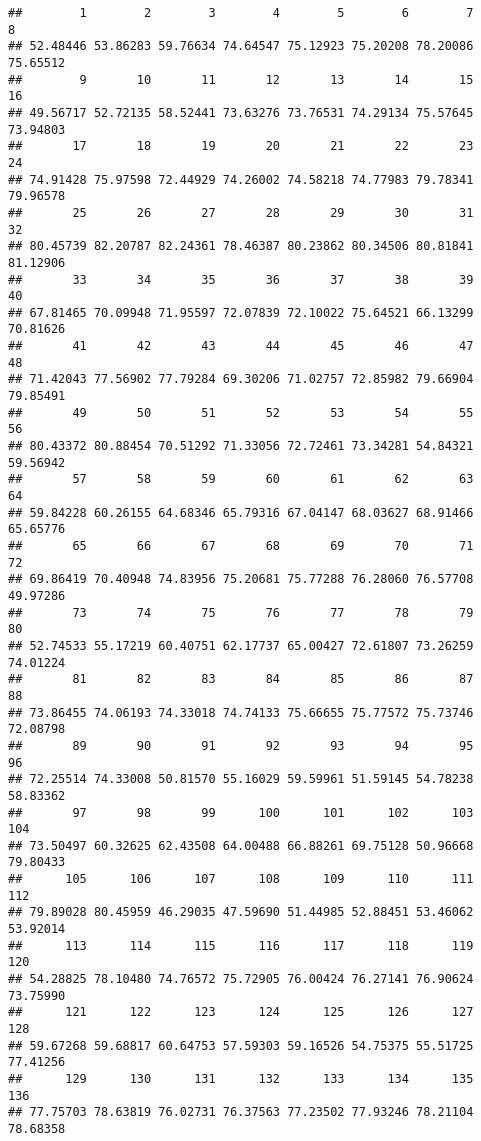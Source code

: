 \documentclass[
]{article}
\begin{document}
\begin{verbatim}
##        1        2        3        4        5        6        7        8 
## 52.48446 53.86283 59.76634 74.64547 75.12923 75.20208 78.20086 75.65512 
##        9       10       11       12       13       14       15       16 
## 49.56717 52.72135 58.52441 73.63276 73.76531 74.29134 75.57645 73.94803 
##       17       18       19       20       21       22       23       24 
## 74.91428 75.97598 72.44929 74.26002 74.58218 74.77983 79.78341 79.96578 
##       25       26       27       28       29       30       31       32 
## 80.45739 82.20787 82.24361 78.46387 80.23862 80.34506 80.81841 81.12906 
##       33       34       35       36       37       38       39       40 
## 67.81465 70.09948 71.95597 72.07839 72.10022 75.64521 66.13299 70.81626 
##       41       42       43       44       45       46       47       48 
## 71.42043 77.56902 77.79284 69.30206 71.02757 72.85982 79.66904 79.85491 
##       49       50       51       52       53       54       55       56 
## 80.43372 80.88454 70.51292 71.33056 72.72461 73.34281 54.84321 59.56942 
##       57       58       59       60       61       62       63       64 
## 59.84228 60.26155 64.68346 65.79316 67.04147 68.03627 68.91466 65.65776 
##       65       66       67       68       69       70       71       72 
## 69.86419 70.40948 74.83956 75.20681 75.77288 76.28060 76.57708 49.97286 
##       73       74       75       76       77       78       79       80 
## 52.74533 55.17219 60.40751 62.17737 65.00427 72.61807 73.26259 74.01224 
##       81       82       83       84       85       86       87       88 
## 73.86455 74.06193 74.33018 74.74133 75.66655 75.77572 75.73746 72.08798 
##       89       90       91       92       93       94       95       96 
## 72.25514 74.33008 50.81570 55.16029 59.59961 51.59145 54.78238 58.83362 
##       97       98       99      100      101      102      103      104 
## 73.50497 60.32625 62.43508 64.00488 66.88261 69.75128 50.96668 79.80433 
##      105      106      107      108      109      110      111      112 
## 79.89028 80.45959 46.29035 47.59690 51.44985 52.88451 53.46062 53.92014 
##      113      114      115      116      117      118      119      120 
## 54.28825 78.10480 74.76572 75.72905 76.00424 76.27141 76.90624 73.75990 
##      121      122      123      124      125      126      127      128 
## 59.67268 59.68817 60.64753 57.59303 59.16526 54.75375 55.51725 77.41256 
##      129      130      131      132      133      134      135      136 
## 77.75703 78.63819 76.02731 76.37563 77.23502 77.93246 78.21104 78.68358 

\end{verbatim}
\end{document}

